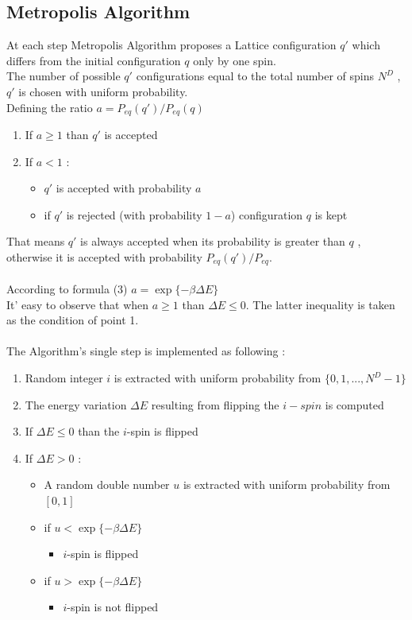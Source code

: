 \documentclass[11pt,a4paper]{article}
\begin{document}
\subsection{Metropolis Algorithm}

At each step Metropolis Algorithm proposes a Lattice configuration $q'$ which differs from the initial configuration $q$ only by one spin.\\ 
The number of possible $q'$ configurations equal to the total number of spins $N^D$ , $q'$ is chosen with uniform probability.
\\Defining the ratio $a = P_{eq}(q')/P_{eq}(q)$ 
\begin{enumerate}
	\item If $a \geq 1$ than $q'$ is accepted 
	\item If $a < 1$ :
		\begin{itemize}
			\item[] $q'$ is accepted with probability $a$
			\item[] if $q'$ is rejected (with probability $1-a$) configuration $q$ is kept
		\end{itemize}				 
\end{enumerate}
That means $q'$ is always accepted when its probability is greater than $q$ , otherwise it is accepted with 
probability $P_{eq}(q')/P_{eq}$.\\
\\
According to formula (3) $a = \exp \lbrace -\beta  \Delta E  \rbrace$ \\
It' easy to observe that when $a \geq 1$ than $ \Delta E \leq 0 $. The latter inequality is taken as the  condition of point 1.  
\\
\\
The Algorithm's single step is implemented as following :
	
\begin{enumerate}
	
	\item Random integer $i$ is extracted with uniform probability from $\{0,1,...,N^D -1\}$
	\item The energy variation $ \Delta E $ resulting from flipping the $i-spin$ is computed		
	\item If $\Delta E \leq 0 $ than the $i$-spin is flipped
	\item If $\Delta E > 0 $ :
		\begin{itemize}
			\item[]  A random double number $u$ is extracted with uniform probability from $[0,1]$
			\item[]	 if $u < \exp \lbrace -\beta  \Delta E  \rbrace $					
			\begin{itemize}
				\item[] $i$-spin is flipped 
			\end{itemize}				 	 
			\item[]	 if $u > \exp \lbrace -\beta  \Delta E  \rbrace $
			\begin{itemize}
				\item[] $i$-spin is not flipped 
			\end{itemize}					
		\end{itemize}				 
\end{enumerate} 
   
\end{document}
